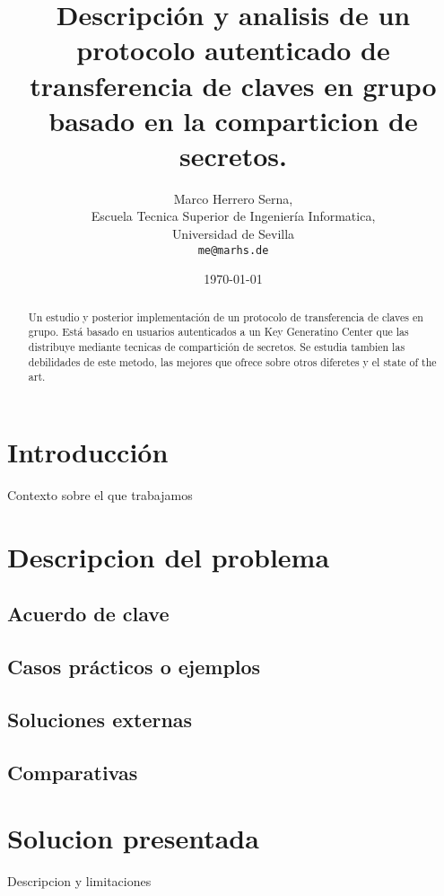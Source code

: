 \documentclass[11pt, spanish]{report}
\begin{document}
\title{Descripción y analisis de un protocolo autenticado de transferencia de claves en grupo basado en la comparticion de secretos.}
\author{Marco Herrero Serna,\\
        Escuela Tecnica Superior de Ingeniería Informatica,\\
        Universidad de Sevilla\\
        \texttt{me@marhs.de}}
\date{\today}
\maketitle


\begin{abstract}
Un estudio y posterior implementación de un protocolo de transferencia de claves en grupo. Está basado en usuarios autenticados a un Key Generatino Center que las distribuye mediante tecnicas de compartición de secretos. Se estudia tambien las debilidades de este metodo, las mejores que ofrece sobre otros diferetes y el state of the art. 
\end{abstract}

\section{Introducción}
 
Contexto sobre el que trabajamos

\section{Descripcion del problema}
    \subsection{Acuerdo de clave}
    \subsection{Casos prácticos o ejemplos }
    \subsection{Soluciones externas }
    \subsection{Comparativas }

\section{Solucion presentada}
Descripcion y limitaciones
\end{document}
